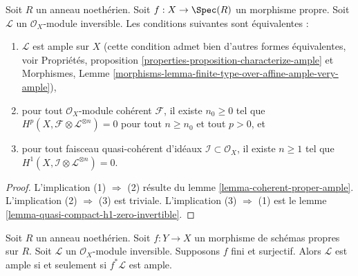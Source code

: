 \begin{lemma}
\label{lemma-vanshing-gives-ample}
\begin{reference}
\cite[III Proposition 2.6.1]{EGA}
\end{reference}
Soit $R$ un anneau noethérien. Soit $f : X \to \Spec(R)$ un morphisme propre.
Soit $\mathcal{L}$ un $\mathcal{O}_X$-module inversible.
Les conditions suivantes sont équivalentes :
\begin{enumerate}
\item $\mathcal{L}$ est ample sur $X$ (cette condition admet bien d'autres formes
équivalentes, voir
Propriétés, proposition \ref{properties-proposition-characterize-ample} et
Morphismes, Lemme
\ref{morphisms-lemma-finite-type-over-affine-ample-very-ample}),
\item pour tout $\mathcal{O}_X$-module cohérent $\mathcal{F}$, il
existe $n_0 \geq 0$ tel que
$H^p(X, \mathcal{F} \otimes \mathcal{L}^{\otimes n}) = 0$ pour tout $n \geq n_0$
et tout $p > 0$, et
\item pour tout faisceau quasi-cohérent d'idéaux
$\mathcal{I} \subset \mathcal{O}_X$, il existe $n \geq 1$
tel que $H^1(X, \mathcal{I} \otimes \mathcal{L}^{\otimes n}) = 0$.
\end{enumerate}
\end{lemma}

\begin{proof}
L'implication (1) $\Rightarrow$ (2) résulte du
lemme \ref{lemma-coherent-proper-ample}.
L'implication (2) $\Rightarrow$ (3) est
triviale. L'implication (3) $\Rightarrow$ (1) est le
lemme \ref{lemma-quasi-compact-h1-zero-invertible}.
\end{proof}

\begin{lemma}
\label{lemma-surjective-finite-morphism-ample}
Soit $R$ un anneau noethérien. Soit $f : Y \to X$ un morphisme de
schémas propres sur $R$. Soit $\mathcal{L}$
un $\mathcal{O}_X$-module inversible. Supposons $f$ fini et surjectif.
Alors $\mathcal{L}$ est ample si et seulement si $f^*\mathcal{L}$ est ample.
\end{lemma}

